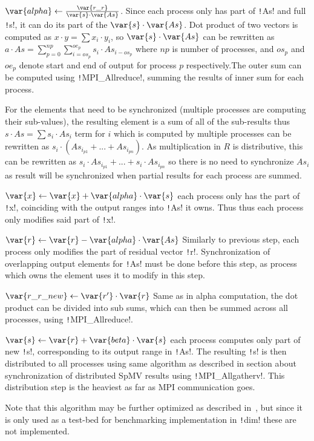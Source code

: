 \documentclass[thesis=M,english]{FITthesis}[2019/12/23]
\newcommand{\csre}[1]{\texttt!#1!}
\begin{document}
$\var{alpha} \gets \frac{\var{r\_r}}{\var{s} \cdot \var{As}}$. Since each process only has part of
\csre{As} and full \csre{s}, it can do its part of the $\var{s} \cdot \var{As}$.
Dot product of two vectors is computed as $x \cdot y = \sum x_i \cdot y_i$, so $\var{s} \cdot \var{As}$
can be rewritten as $a \cdot As = \sum_{p=0}^{np} \sum_{i=os_p}^{oe_p} s_i \cdot As_{i-os_p}$ where
$np$ is number of processes, and $os_p$ and $oe_p$ denote start and end of output for process
$p$ respectively.The outer sum can be computed using \csre{MPI_Allreduce},
summing the results of inner sum for each process.

For the elements that need to be synchronized (multiple processes are computing their sub-values),
the resulting element is a sum of all of the sub-results thus $s \cdot As = \sum s_i \cdot As_i$ term for $i$
which is computed by multiple processes can be rewritten as $s_i \cdot (As_{i_{p1}} + ... + As_{i_{pn}})$.
As multiplication in $R$ is distributive, this can be rewritten as $s_i \cdot As_{i_{p1}} + ... + s_i \cdot As_{i_{pn}}$
so there is no need to synchronize $As_i$ as result will be synchronized when partial results for
each process are summed.

$\var{x} \gets \var{x} + \var{alpha} \cdot \var{s}$ each process only has the part of \csre{x},
coinciding with the output ranges into \csre{As} it owns. Thus thus each process only
modifies said part of \csre{x}.

$\var{r} \gets \var{r} - \var{alpha} \cdot \var{As}$ Similarly to previous step, each process
only modifies the part of residual vector \csre{r}. Synchronization of overlapping
output elements for \csre{As} must be done before this step, as process which owns the
element uses it to modify  in this step.

$\var{r\_r\_new} \gets \var{r'} \cdot \var{r}$ Same as in alpha computation, the dot product
can be divided into sub sums, which can then be summed across all processes, using
\csre{MPI_Allreduce}.

$\var{s} \gets \var{r} + \var{beta} \cdot \var{s}$ each process computes only part of new
\csre{s}, corresponding to its output range in \csre{As}. The resulting \csre{s} is
then distributed to all processes using same algorithm as described in section
about synchronization of distributed SpMV results using \csre{MPI_Allgatherv}.
This distribution step is the heaviest as far as MPI communication goes.

Note that this algorithm may be further optimized as described in~\cite{distCGwRedSync}, but
since it is only used as a test-bed for benchmarking implementation in \csre{dim} these are not
implemented.
\end{document}
